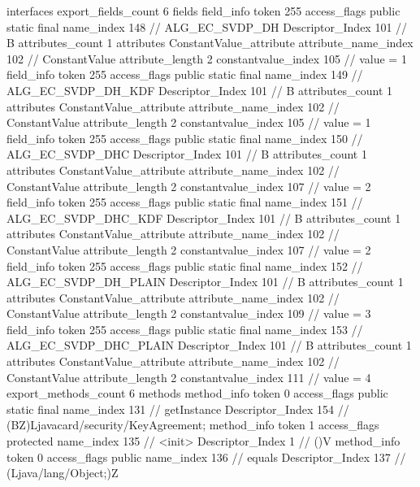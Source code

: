 {{{			interfaces {
			}
			export_fields_count	6
			fields {
			field_info {
				token	255
				access_flags	public static final
				name_index	148		// ALG_EC_SVDP_DH
				Descriptor_Index	101		// B
				attributes_count	1
				attributes {
				ConstantValue_attribute {
					attribute_name_index	102		// ConstantValue
					attribute_length	2
					constantvalue_index	105		// value = 1
				}
				}
			}
			field_info {
				token	255
				access_flags	public static final
				name_index	149		// ALG_EC_SVDP_DH_KDF
				Descriptor_Index	101		// B
				attributes_count	1
				attributes {
				ConstantValue_attribute {
					attribute_name_index	102		// ConstantValue
					attribute_length	2
					constantvalue_index	105		// value = 1
				}
				}
			}
			field_info {
				token	255
				access_flags	public static final
				name_index	150		// ALG_EC_SVDP_DHC
				Descriptor_Index	101		// B
				attributes_count	1
				attributes {
				ConstantValue_attribute {
					attribute_name_index	102		// ConstantValue
					attribute_length	2
					constantvalue_index	107		// value = 2
				}
				}
			}
			field_info {
				token	255
				access_flags	public static final
				name_index	151		// ALG_EC_SVDP_DHC_KDF
				Descriptor_Index	101		// B
				attributes_count	1
				attributes {
				ConstantValue_attribute {
					attribute_name_index	102		// ConstantValue
					attribute_length	2
					constantvalue_index	107		// value = 2
				}
				}
			}
			field_info {
				token	255
				access_flags	public static final
				name_index	152		// ALG_EC_SVDP_DH_PLAIN
				Descriptor_Index	101		// B
				attributes_count	1
				attributes {
				ConstantValue_attribute {
					attribute_name_index	102		// ConstantValue
					attribute_length	2
					constantvalue_index	109		// value = 3
				}
				}
			}
			field_info {
				token	255
				access_flags	public static final
				name_index	153		// ALG_EC_SVDP_DHC_PLAIN
				Descriptor_Index	101		// B
				attributes_count	1
				attributes {
				ConstantValue_attribute {
					attribute_name_index	102		// ConstantValue
					attribute_length	2
					constantvalue_index	111		// value = 4
				}
				}
			}
			}
			export_methods_count	6
			methods {
				method_info {
					token	0
					access_flags	public static final
					name_index	131		// getInstance
					Descriptor_Index	154		// (BZ)Ljavacard/security/KeyAgreement;
				}
				method_info {
					token	1
					access_flags	protected
					name_index	135		// <init>
					Descriptor_Index	1		// ()V
				}
				method_info {
					token	0
					access_flags	public
					name_index	136		// equals
					Descriptor_Index	137		// (Ljava/lang/Object;)Z
				}
}}}}
